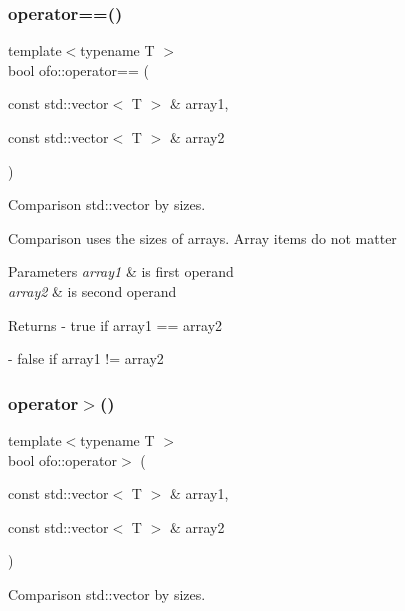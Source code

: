 \subsubsection{\texorpdfstring{operator==()}{operator==()}}
{\footnotesize\ttfamily template$<$typename T $>$ \\
bool ofo\+::operator== (\begin{DoxyParamCaption}\item[{const std\+::vector$<$ T $>$ \&}]{array1,  }\item[{const std\+::vector$<$ T $>$ \&}]{array2 }\end{DoxyParamCaption})}



Comparison std\+::vector by sizes. 

Comparison uses the sizes of arrays. Array items do not matter 
\begin{DoxyParams}{Parameters}
{\em array1} & is first operand \\
\hline
{\em array2} & is second operand \\
\hline
\end{DoxyParams}
\begin{DoxyReturn}{Returns}
-\/ true if \textquotesingle{}array1\textquotesingle{} == \textquotesingle{}array2\textquotesingle{} 

-\/ false if \textquotesingle{}array1\textquotesingle{} != \textquotesingle{}array2\textquotesingle{} 
\end{DoxyReturn}
\mbox{\label{namespaceofo_a5721f395418c99bbb91789f73f6fe7e4}} 
\subsubsection{\texorpdfstring{operator$>$()}{operator>()}}
{\footnotesize\ttfamily template$<$typename T $>$ \\
bool ofo\+::operator$>$ (\begin{DoxyParamCaption}\item[{const std\+::vector$<$ T $>$ \&}]{array1,  }\item[{const std\+::vector$<$ T $>$ \&}]{array2 }\end{DoxyParamCaption})}



Comparison std\+::vector by sizes. 

